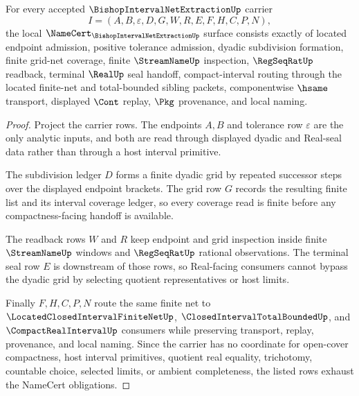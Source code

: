 
\begin{theorem}
\label{thm:bishop-interval-net-extraction-namecert}
For every accepted $\BishopIntervalNetExtractionUp$ carrier
$$
I=(A,B,\varepsilon,D,G,W,R,E,F,H,C,P,N),
$$
the local $\NameCert_{\BishopIntervalNetExtractionUp}$ surface consists exactly of located endpoint admission, positive tolerance admission, dyadic subdivision formation, finite grid-net coverage, finite $\StreamNameUp$ inspection, $\RegSeqRatUp$ readback, terminal $\RealUp$ seal handoff, compact-interval routing through the located finite-net and total-bounded sibling packets, componentwise $\hsame$ transport, displayed $\Cont$ replay, $\Pkg$ provenance, and local naming.
\end{theorem}
\begin{proof}
Project the carrier rows. The endpoints $A,B$ and tolerance row $\varepsilon$ are the only analytic inputs, and both are read through displayed dyadic and Real-seal data rather than through a host interval primitive.

The subdivision ledger $D$ forms a finite dyadic grid by repeated successor steps over the displayed endpoint brackets. The grid row $G$ records the resulting finite list and its interval coverage ledger, so every coverage read is finite before any compactness-facing handoff is available.

The readback rows $W$ and $R$ keep endpoint and grid inspection inside finite $\StreamNameUp$ windows and $\RegSeqRatUp$ rational observations. The terminal seal row $E$ is downstream of those rows, so Real-facing consumers cannot bypass the dyadic grid by selecting quotient representatives or host limits.

Finally $F,H,C,P,N$ route the same finite net to $\LocatedClosedIntervalFiniteNetUp$, $\ClosedIntervalTotalBoundedUp$, and $\CompactRealIntervalUp$ consumers while preserving transport, replay, provenance, and local naming. Since the carrier has no coordinate for open-cover compactness, host interval primitives, quotient real equality, trichotomy, countable choice, selected limits, or ambient completeness, the listed rows exhaust the NameCert obligations.
\end{proof}


